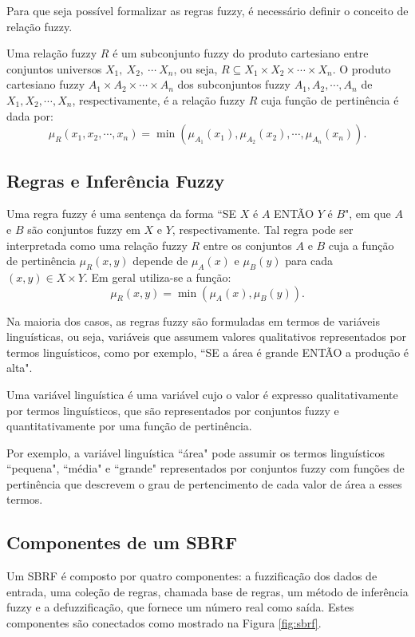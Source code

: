 Para que seja possível formalizar as regras fuzzy, é necessário definir o conceito de relação fuzzy.
\begin{definicao}
    Uma relação fuzzy $R$ é um subconjunto fuzzy do produto cartesiano entre conjuntos universos $X_1, \ X_2, \ \cdots \ X_n$, ou seja, $R \subseteq X_1 \times X_2 \times \cdots \times X_n$. O produto cartesiano fuzzy $A_1 \times A_2 \times \cdots \times A_n$ dos subconjuntos fuzzy $A_1, A_2, \cdots, A_n$ de $X_1, X_2, \cdots, X_n$, respectivamente, é a relação fuzzy $R$ cuja função de pertinência é dada por:
$$\mu_R(x_1, x_2, \cdots, x_n) = \min(\mu_{A_1}(x_1), \mu_{A_2}(x_2), \cdots, \mu_{A_n}(x_n)).$$
\end{definicao}

\subsection{Regras e Inferência Fuzzy}
Uma regra fuzzy é uma sentença da forma ``SE $X$ é $A$ ENTÃO $Y$ é $B$", em que $A$ e $B$ são conjuntos fuzzy em $X$ e $Y$, respectivamente. Tal regra pode ser interpretada como uma relação fuzzy $R$ entre os conjuntos $A$ e $B$ cuja a função de pertinência $\mu_R(x,y)$ depende de $\mu_A(x)$ e $\mu_B(y)$ para cada $(x,y) \in X \times Y$. Em geral utiliza-se a função: $$\mu_R(x,y) = \min(\mu_A(x), \mu_B(y)).$$

Na maioria dos casos, as regras fuzzy são formuladas em termos de variáveis linguísticas, ou seja, variáveis que assumem valores qualitativos representados por termos linguísticos, como por exemplo, ``SE a área é grande ENTÃO a produção é alta". 
\begin{definicao}
Uma variável linguística é uma variável cujo o valor é expresso qualitativamente por termos linguísticos, que são representados por conjuntos fuzzy e quantitativamente por uma função de pertinência. 
\end{definicao}
Por exemplo, a variável linguística ``área" pode assumir os termos linguísticos ``pequena", ``média" e ``grande" representados por conjuntos fuzzy com funções de pertinência que descrevem o grau de pertencimento de cada valor de área a esses termos.

\subsection{Componentes de um SBRF}
Um SBRF é composto por quatro componentes: a fuzzificação dos dados de entrada, uma coleção de regras, chamada base de regras, um método de inferência fuzzy e a defuzzificação, que fornece um número real como saída. Estes componentes são conectados como mostrado na Figura \ref{fig:sbrf}.

